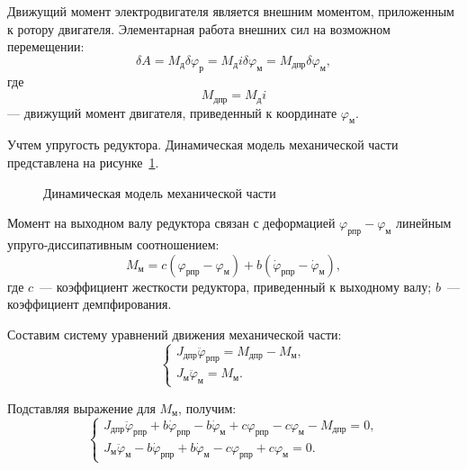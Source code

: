 Движущий момент электродвигателя является внешним моментом, приложенным к ротору двигателя. Элементарная работа внешних сил на возможном перемещении:
\begin{equation}
    \delta A =
    M_{\text{д}} \delta \varphi_{\text{р}}
    =
    M_{\text{д}} i \delta \varphi_{\text{м}}
    =
    M_{\text{дпр}} \delta \varphi_{\text{м}},
\end{equation}
где
\begin{equation}
    M_{\text{дпр}} = M_{\text{д}} i
\end{equation}
--- движущий момент двигателя, приведенный к координате $\varphi_{\text{м}}$.

Учтем упругость редуктора. Динамическая модель механической части представлена на рисунке~\ref{fig:dynamic_model}.

\begin{figure}[H]
    \centering
    
    \caption{Динамическая модель механической части}
    \label{fig:dynamic_model}
\end{figure}

Момент на выходном валу редуктора связан с деформацией $\varphi_{\text{рпр}} - \varphi_{\text{м}}$ линейным упруго-диссипативным соотношением:
\begin{equation}
    M_{\text{м}}
    =
    c \left(
        \varphi_{\text{рпр}} - \varphi_{\text{м}}
    \right)
    +
    b \left(
        \dot{\varphi}_{\text{рпр}} - \dot{\varphi}_{\text{м}}
    \right),
\end{equation}
где $c$~--- коэффициент жесткости редуктора, приведенный к выходному валу; $b$~--- коэффициент демпфирования.

Составим систему уравнений движения механической части:
\begin{equation}
    \begin{cases}
        J_{\text{дпр}} \ddot{\varphi}_{\text{рпр}}
        =
        M_{\text{дпр}} - M_{\text{м}},
        \\
        J_{\text{м}} \ddot{\varphi}_{\text{м}}
        =
        M_{\text{м}}.
    \end{cases}
\end{equation}

Подставляя выражение для $M_{\text{м}}$, получим:
\begin{equation}
    \begin{cases}
        J_{\text{дпр}} \ddot{\varphi}_{\text{рпр}}
        +
        b \dot{\varphi}_{\text{рпр}}
        -
        b \dot{\varphi}_{\text{м}}
        +
        c \varphi_{\text{рпр}}
        -
        c \varphi_{\text{м}}
        -
        M_{\text{дпр}}
        =
        0,
        \\
        J_{\text{м}} \ddot{\varphi}_{\text{м}}
        -
        b \dot{\varphi}_{\text{рпр}}
        +
        b \dot{\varphi}_{\text{м}}
        -
        c \varphi_{\text{рпр}}
        +
        c \varphi_{\text{м}}
        =
        0.
    \end{cases}
\end{equation}
